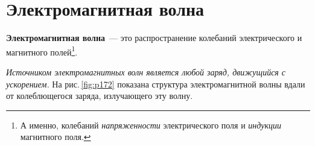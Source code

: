 \documentclass[main.tex]{subfiles}
\begin{document}

 

 

 
   

\section{Электромагнитная волна}


\textbf{Электромагнитная волна}~--- это распространение колебаний электрического и магнитного полей\footnote{А именно, колебаний \emph{напряженности} электрического поля и \emph{индукции} магнитного поля.}. 

\emph{Источником электромагнитных волн является любой заряд, движущийся с ускорением.} На рис.\,\ref{fig:p172} показана структура электромагнитной волны вдали от колеблющегося заряда, излучающего эту волну.
\end{document}
